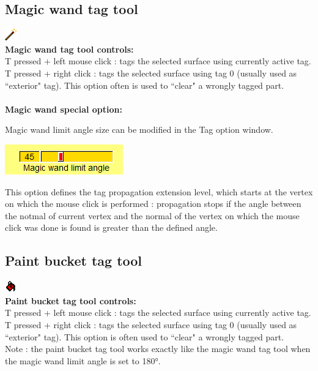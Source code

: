 \subsection{Magic wand tag tool}
\includegraphics[scale=0.7]{images/pixmap/magic_wand.png}\\
\textbf{Magic wand tag tool controls:}\\
T pressed + left mouse click : tags the selected surface using currently active tag.
T pressed + right click : tags the selected surface using tag 0 (usually used as ``exterior" tag). This option often is used to ``clear" a wrongly tagged part.\\
\\
\noindent
\textbf{Magic wand special option:}\\
\noindent
\begin{minipage}{0.6\textwidth}
Magic wand limit angle size can be modified in the Tag option window.
\end{minipage}    
\begin{minipage}{0.4\textwidth}\centering
  \includegraphics[scale=0.5]{images/Tags/Magic_wand_options.png}
 \end{minipage} 
\noindent
 This option defines the tag propagation extension level, which starts at the vertex on which the mouse click is performed : propagation stops if the angle between the notmal of current vertex and the normal of the vertex on which the mouse click was done is found is greater than the defined
angle.



\subsection{Paint bucket tag tool}
\includegraphics[scale=0.7]{images/pixmap/Flood_fill.png}\\
\textbf{Paint bucket tag tool controls:}\\
T pressed + left mouse click : tags the selected surface using currently active tag.\\
T pressed + right click : tags the selected surface using tag 0 (usually used as ``exterior" tag). This option is often used to ``clear" a wrongly tagged part.\\
Note : the paint bucket tag tool works exactly like the magic wand tag tool when the magic wand limit angle is set to 180°.

